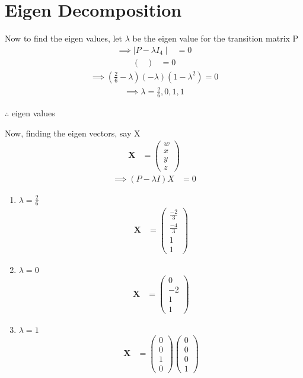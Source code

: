\documentclass[journal,12pt,two column]{IEEEtran}
\theoremstyle{remark}
\newcommand{\myvec}[1]{\ensuremath{\begin{pmatrix}#1\end{pmatrix}}}
\let\vec\mathbf
\begin{document}
\section{Eigen Decomposition}    
 Now to find the eigen values, let $\lambda$  be the eigen value for the transition matrix P\\
 \begin{align}
 \implies   \mid P-\lambda {I_4} \mid &= 0  
 \end{align}
 \begin{align}
 \myvec{} &= 0
 \end{align}
 \begin{align}
 \implies (\frac{2}{6} - \lambda)(-\lambda)(1 - \lambda^2) = 0
 \end{align}
 \begin{align}
 \implies \lambda = \frac{2}{6}, 0 , 1 , 1 
 \end{align}
 \begin{center}    
$ \therefore $ eigen values\\
\end{center}
Now, finding the eigen vectors, say X\\
\begin{align}
\vec{X} &= \myvec{w \\ x \\ y \\ z} 
\end{align}
\begin{align}
\implies (P - \lambda I)X &= 0
\end{align}
\begin{enumerate}
\item $\lambda = \frac{2}{6}$
\begin{align}
\vec{X} &= \myvec{\frac{-2}{3}\\[4pt] \frac{-4}{3}\\[4pt] 1\\[4pt] 1}
\end{align}
\item $\lambda = 0$
\begin{align}
\vec{X} &= \myvec{0 \\[2pt] -2\\[2pt] 1\\ 1}
\end{align}
\item $\lambda = 1$
\begin{align}
\vec{X} &= \myvec{0 \\ 0 \\ 1 \\ 0} 
\myvec{0 \\ 0 \\ 0 \\ 1}\\
\end{align}
\end{enumerate}
\end{document}
